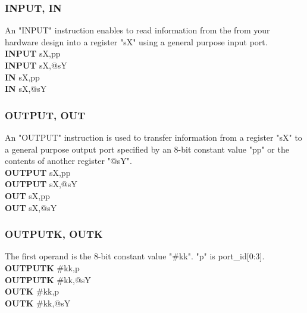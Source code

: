         \subsubsection{INPUT, IN}
            An "INPUT" instruction enables to read information from the from your hardware design into a register "sX" using a general purpose input port.\\
                \textbf{INPUT}      sX,pp\\
                \textbf{INPUT}      sX,@sY\\
                \textbf{IN}         sX,pp\\
                \textbf{IN}         sX,@sY\\
        \subsubsection{OUTPUT, OUT}
            An "OUTPUT" instruction is used to transfer information from a register "sX" to a general purpose output port specified by an 8-bit constant value "pp" or the
            contents of another register "@sY".\\
                \textbf{OUTPUT}     sX,pp\\
                \textbf{OUTPUT}     sX,@sY\\
                \textbf{OUT}        sX,pp\\
                \textbf{OUT}        sX,@sY\\
        \subsubsection{OUTPUTK, OUTK}
            The first operand is the 8-bit constant value "\#kk". "p" is port\_id[0:3].\\
                \textbf{OUTPUTK}     \#kk,p\\
                \textbf{OUTPUTK}     \#kk,@sY\\
                \textbf{OUTK}        \#kk,p\\
                \textbf{OUTK}        \#kk,@sY\\
